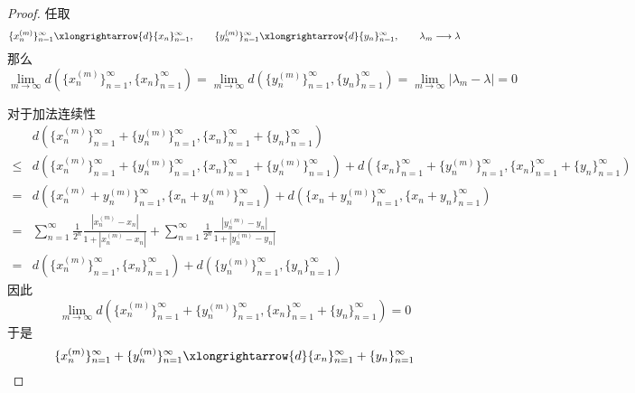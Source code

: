 \documentclass[lang = cn, scheme = chinese, thmcnt = section]{elegantbook}
\begin{document}
\begin{proof}
	任取
	$$
	\{x_n^{(m)}\}_{n=1}^{\infty}\xlongrightarrow{d}\{x_n\}_{n=1}^{\infty},\qquad 
	\{y_n^{(m)}\}_{n=1}^{\infty}\xlongrightarrow{d}\{y_n\}_{n=1}^{\infty},\qquad 
	\lambda_m\longrightarrow \lambda
	$$
	那么
	$$
	\lim_{m\to\infty}d(\{x_n^{(m)}\}_{n=1}^{\infty},\{x_n\}_{n=1}^{\infty})=
	\lim_{m\to\infty}d(\{y_n^{(m)}\}_{n=1}^{\infty},\{y_n\}_{n=1}^{\infty})= 
	\lim_{m\to\infty}|\lambda_m-\lambda|=0
	$$
	
	对于加法连续性
	\begin{align*}
		& d(\{x_n^{(m)}\}_{n=1}^{\infty}+\{y_n^{(m)}\}_{n=1}^{\infty},
		\{x_n\}_{n=1}^{\infty}+\{y_n\}_{n=1}^{\infty})\\
		\le &   d(\{x_n^{(m)}\}_{n=1}^{\infty}+\{y_n^{(m)}\}_{n=1}^{\infty},
		\{x_n\}_{n=1}^{\infty}+\{y_n^{(m)}\}_{n=1}^{\infty})+
		d(\{x_n\}_{n=1}^{\infty}+\{y_n^{(m)}\}_{n=1}^{\infty},
		\{x_n\}_{n=1}^{\infty}+\{y_n\}_{n=1}^{\infty})\\
		= &   d(\{x_n^{(m)}+y_n^{(m)}\}_{n=1}^{\infty},
		\{x_n+y_n^{(m)}\}_{n=1}^{\infty})+
		d(\{x_n+y_n^{(m)}\}_{n=1}^{\infty},
		\{x_n+y_n\}_{n=1}^{\infty})\\
		= & \sum_{n=1}^{\infty}\frac{1}{2^n}\frac{|x_n^{(m)}-x_n|}{1+|x_n^{(m)}-x_n|}+
		\sum_{n=1}^{\infty}\frac{1}{2^n}\frac{|y_n^{(m)}-y_n|}{1+|y_n^{(m)}-y_n|}\\
		= & d(\{x_n^{(m)}\}_{n=1}^{\infty},\{x_n\}_{n=1}^{\infty})+d(\{y_n^{(m)}\}_{n=1}^{\infty},\{y_n\}_{n=1}^{\infty})
	\end{align*}
	因此
	$$
	\lim_{m\to\infty}d(\{x_n^{(m)}\}_{n=1}^{\infty}+\{y_n^{(m)}\}_{n=1}^{\infty},
	\{x_n\}_{n=1}^{\infty}+\{y_n\}_{n=1}^{\infty})=
	0
	$$
	于是
	$$
	\{x_n^{(m)}\}_{n=1}^{\infty}+\{y_n^{(m)}\}_{n=1}^{\infty}\xlongrightarrow{d}\{x_n\}_{n=1}^{\infty}+\{y_n\}_{n=1}^{\infty}
	$$
	

\end{proof}
\end{document}
